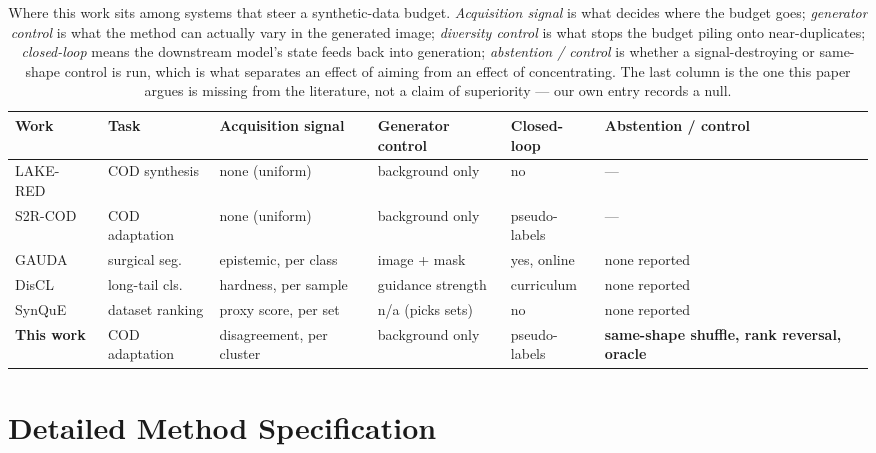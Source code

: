 \documentclass{article}
\begin{document}
\begin{table}[t]
\caption{Where this work sits among systems that steer a synthetic-data budget. \emph{Acquisition
signal} is what decides where the budget goes; \emph{generator control} is what the method can
actually vary in the generated image; \emph{diversity control} is what stops the budget piling onto
near-duplicates; \emph{closed-loop} means the downstream model's state feeds back into generation;
\emph{abstention / control} is whether a signal-destroying or same-shape control is run, which is
what separates an effect of aiming from an effect of concentrating. The last column is the one this
paper argues is missing from the literature, not a claim of superiority --- our own entry records a
null.}
\label{tab:closest}
\begin{center}
\small
\setlength{\tabcolsep}{3pt}
\footnotesize
\begin{tabular}{@{}lp{1.75cm}p{1.9cm}p{1.75cm}p{1.35cm}p{1.9cm}@{}}
\toprule
Work & Task & Acquisition signal & Generator control & Closed-loop & Abstention / control \\
\midrule
LAKE-RED~\citep{zhao2024lakered} & COD synthesis & none (uniform) & background only & no & --- \\
S2R-COD~\citep{luo2025s2rcod} & COD adaptation & none (uniform) & background only & pseudo-labels & --- \\
GAUDA~\citep{frisch2025gauda} & surgical seg. & epistemic, per class & image + mask & yes, online & none reported \\
DisCL~\citep{liang2025discl} & long-tail cls. & hardness, per sample & guidance strength & curriculum & none reported \\
SynQuE~\citep{chen2025synque} & dataset ranking & proxy score, per set & n/a (picks sets) & no & none reported \\
\midrule
\textbf{This work} & COD adaptation & disagreement, per cluster & background only & pseudo-labels &
\textbf{same-shape shuffle, rank reversal, oracle} \\
\bottomrule
\end{tabular}
\end{center}
\end{table}

\section{Detailed Method Specification}
\label{app:method}
\end{document}
